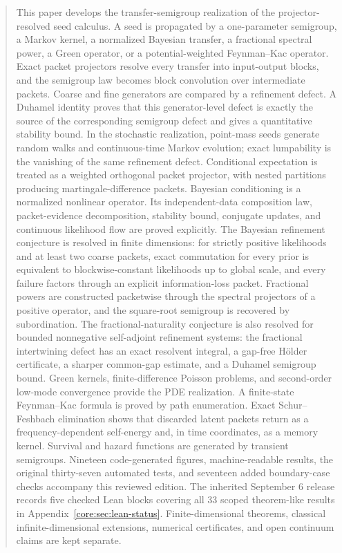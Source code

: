 \documentclass[11pt,a4paper]{article}
\theoremstyle{definition}
\theoremstyle{remark}
\begin{document}
\begin{abstract}
This paper develops the transfer-semigroup realization of the projector-resolved seed calculus. A seed is propagated by a one-parameter semigroup, a Markov kernel, a normalized Bayesian transfer, a fractional spectral power, a Green operator, or a potential-weighted Feynman--Kac operator. Exact packet projectors resolve every transfer into input-output blocks, and the semigroup law becomes block convolution over intermediate packets. Coarse and fine generators are compared by a refinement defect. A Duhamel identity proves that this generator-level defect is exactly the source of the corresponding semigroup defect and gives a quantitative stability bound. In the stochastic realization, point-mass seeds generate random walks and continuous-time Markov evolution; exact lumpability is the vanishing of the same refinement defect. Conditional expectation is treated as a weighted orthogonal packet projector, with nested partitions producing martingale-difference packets. Bayesian conditioning is a normalized nonlinear operator. Its independent-data composition law, packet-evidence decomposition, stability bound, conjugate updates, and continuous likelihood flow are proved explicitly.  The Bayesian refinement conjecture is resolved in finite dimensions: for strictly positive likelihoods and at least two coarse packets, exact commutation for every prior is equivalent to blockwise-constant likelihoods up to global scale, and every failure factors through an explicit information-loss packet. Fractional powers are constructed packetwise through the spectral projectors of a positive operator, and the square-root semigroup is recovered by subordination. The fractional-naturality conjecture is also resolved for bounded nonnegative self-adjoint refinement systems: the fractional intertwining defect has an exact resolvent integral, a gap-free Hölder certificate, a sharper common-gap estimate, and a Duhamel semigroup bound. Green kernels, finite-difference Poisson problems, and second-order low-mode convergence provide the PDE realization. A finite-state Feynman--Kac formula is proved by path enumeration. Exact Schur--Feshbach elimination shows that discarded latent packets return as a frequency-dependent self-energy and, in time coordinates, as a memory kernel. Survival and hazard functions are generated by transient semigroups. Nineteen code-generated figures, machine-readable results, the original thirty-seven automated tests, and seventeen added boundary-case checks accompany this reviewed edition. The inherited September 6 release records five checked Lean blocks covering all 33 scoped theorem-like results in Appendix~\ref{core:sec:lean-status}. Finite-dimensional theorems, classical infinite-dimensional extensions, numerical certificates, and open continuum claims are kept separate.
\end{abstract}
\end{document}
